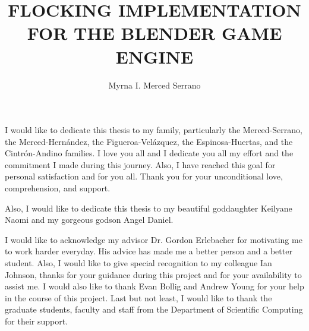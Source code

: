\documentclass[11pt]{fsuthesis}
\title{FLOCKING IMPLEMENTATION FOR THE BLENDER GAME ENGINE}
\author{Myrna I. Merced Serrano}
\begin{document}
\frontmatter
\maketitle
\makesignaturepage

\begin{dedication}
I would like to dedicate this thesis to my family, particularly the Merced-Serrano, the Merced-Hern\'{a}ndez, the Figueroa-Vel\'{a}zquez, the Espinosa-Huertas, and the Cintr\'{o}n-Andino families. I love you all and I dedicate you all my effort and the commitment I made during this journey. Also, I have reached this goal for personal satisfaction and for you all. Thank you for your unconditional love, comprehension, and support. 

Also, I would like to dedicate this thesis to my beautiful goddaughter Keilyane Naomi and my gorgeous godson Angel Daniel.

\end{dedication}

\begin{acknowledgments}
I would like to acknowledge my advisor Dr. Gordon Erlebacher for motivating me to work harder everyday. His advice has made me a better person and a better student. Also, I would like to give special recognition to my colleague Ian Johnson, thanks for your guidance during this project and for your availability to assist me. I would also like to thank Evan Bollig and Andrew Young for your help in the course of this project. Last but not least, I would like to thank the graduate students, faculty and staff  from the Department of Scientific Computing for their support.
\end{acknowledgments}

\tableofcontents
\listoftables
\listoffigures



\onehalfspacing
\end{document}
